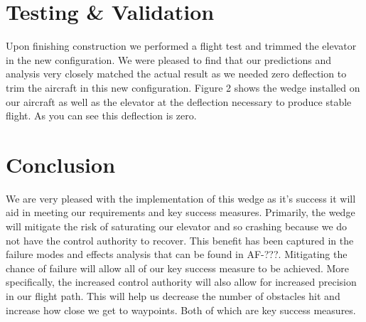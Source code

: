 \documentclass[]{auvsi_doc}
\begin{document}
\section{Testing \& Validation}

Upon finishing construction we performed a flight test and trimmed the elevator in the new configuration. We were pleased to find that our predictions and analysis very closely matched the actual result as we needed zero deflection to trim the aircraft in this new configuration. Figure 2 shows the wedge installed on our aircraft as well as the elevator at the deflection necessary to produce stable flight. As you can see this deflection is zero.

\section{Conclusion}

We are very pleased with the implementation of this wedge as it's success it will aid in meeting our requirements and key success measures. Primarily, the wedge will mitigate the risk of saturating our elevator and so crashing because we do not have the control authority to recover. This benefit has been captured in the failure modes and effects analysis that can be found in AF-???. Mitigating the chance of failure will allow all of our key success measure to be achieved. More specifically, the increased control authority will also allow for increased precision in our flight path. This will help us decrease the number of obstacles hit and increase how close we get to waypoints. Both of which are key success measures.
\end{document}
